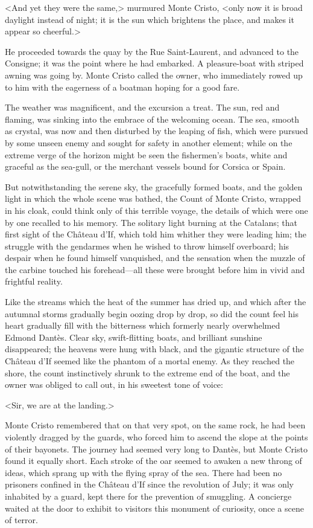  <And yet they were the same,> murmured Monte Cristo, <only now it is broad daylight instead of night; it is the sun which brightens the place, and makes it appear so cheerful.> 

 He proceeded towards the quay by the Rue Saint-Laurent, and advanced to the Consigne; it was the point where he had embarked. A pleasure-boat with striped awning was going by. Monte Cristo called the owner, who immediately rowed up to him with the eagerness of a boatman hoping for a good fare. 

 The weather was magnificent, and the excursion a treat. The sun, red and flaming, was sinking into the embrace of the welcoming ocean. The sea, smooth as crystal, was now and then disturbed by the leaping of fish, which were pursued by some unseen enemy and sought for safety in another element; while on the extreme verge of the horizon might be seen the fishermen's boats, white and graceful as the sea-gull, or the merchant vessels bound for Corsica or Spain. 

 But notwithstanding the serene sky, the gracefully formed boats, and the golden light in which the whole scene was bathed, the Count of Monte Cristo, wrapped in his cloak, could think only of this terrible voyage, the details of which were one by one recalled to his memory. The solitary light burning at the Catalans; that first sight of the Château d'If, which told him whither they were leading him; the struggle with the gendarmes when he wished to throw himself overboard; his despair when he found himself vanquished, and the sensation when the muzzle of the carbine touched his forehead—all these were brought before him in vivid and frightful reality. 

 Like the streams which the heat of the summer has dried up, and which after the autumnal storms gradually begin oozing drop by drop, so did the count feel his heart gradually fill with the bitterness which formerly nearly overwhelmed Edmond Dantès. Clear sky, swift-flitting boats, and brilliant sunshine disappeared; the heavens were hung with black, and the gigantic structure of the Château d'If seemed like the phantom of a mortal enemy. As they reached the shore, the count instinctively shrunk to the extreme end of the boat, and the owner was obliged to call out, in his sweetest tone of voice: 

 <Sir, we are at the landing.> 

 Monte Cristo remembered that on that very spot, on the same rock, he had been violently dragged by the guards, who forced him to ascend the slope at the points of their bayonets. The journey had seemed very long to Dantès, but Monte Cristo found it equally short. Each stroke of the oar seemed to awaken a new throng of ideas, which sprang up with the flying spray of the sea.  There had been no prisoners confined in the Château d'If since the revolution of July; it was only inhabited by a guard, kept there for the prevention of smuggling. A concierge waited at the door to exhibit to visitors this monument of curiosity, once a scene of terror. 

